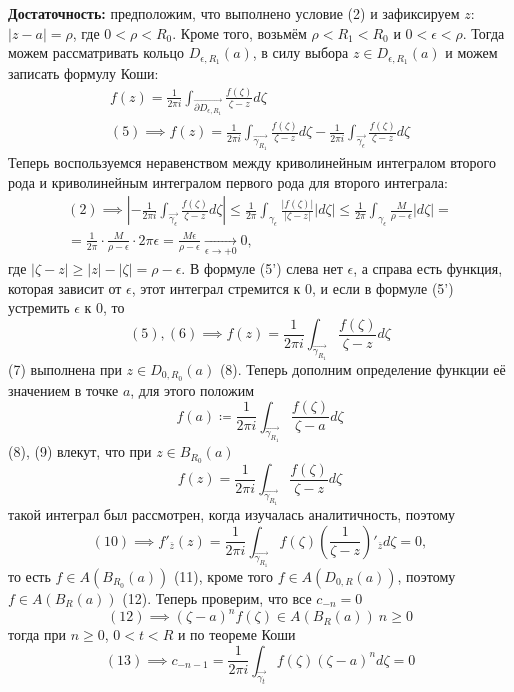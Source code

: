 \documentclass[main]{subfiles}
\begin{document}
\begin{longProof}
    \textbf{Достаточность:} предположим, что выполнено условие (2) и зафиксируем $z$: $|z - a| = \rho$, где $0 < \rho < R_0$.
    Кроме того, возьмём $\rho < R_1 < R_0$ и $0 < \epsilon < \rho$.
    Тогда можем рассматривать кольцо $D_{\epsilon, R_1}(a)$, в силу выбора $z \in D_{\epsilon, R_1}(a)$ и можем записать формулу Коши:
    \begin{gather*}
        f(z) = \frac{1}{2 \pi i} \int_{\overrightarrow{\partial D_{\epsilon, R_1}}} \frac{f(\zeta)}{\zeta - z} d\zeta \tag{5}\\
        (5) \implies f(z) = \frac{1}{2 \pi i } \int_{\overrightarrow{\gamma_{R_1}}} \frac{f(\zeta)}{\zeta - z} d\zeta - \frac{1}{2 \pi i } \int_{\overrightarrow{\gamma_{\epsilon}}} \frac{f(\zeta)}{\zeta - z} d\zeta \tag{5'}
    \end{gather*}
    Теперь воспользуемся неравенством между криволинейным интегралом второго рода и криволинейным интегралом первого рода для второго интеграла:
    \begin{multline*}
        (2) \implies \left| - \frac{1}{2 \pi i } \int_{\overrightarrow{\gamma_{\epsilon}}} \frac{f(\zeta)}{\zeta - z} d\zeta \right| \le \frac{1}{2 \pi} \int_{\gamma_{\epsilon}} \frac{|f(\zeta)|}{|\zeta - z|} |d\zeta| \le \frac{1}{2 \pi} \int_{\gamma_{\epsilon}} \frac{M}{\rho - \epsilon} |d\zeta| = \\
        = \frac{1}{2 \pi} \cdot \frac{M}{\rho - \epsilon} \cdot 2 \pi \epsilon = \frac{M\epsilon}{\rho - \epsilon} \xrightarrow[\epsilon \to +0]{} 0, \tag{6}
    \end{multline*}
    где $|\zeta - z| \ge |z| - |\zeta| = \rho - \epsilon$.
    В формуле (5') слева нет $\epsilon$, а справа есть функция, которая зависит от $\epsilon$, этот интеграл стремится к 0, и если в формуле (5') устремить $\epsilon$ к 0, то
    \[(5), (6) \implies f(z) = \frac{1}{2 \pi i} \int_{\overrightarrow{\gamma_{R_1}}} \frac{f(\zeta)}{\zeta - z} d\zeta \tag{7}\]
    (7) выполнена при $z \in D_{0, R_0} (a)$ (8).
    Теперь дополним определение функции её значением в точке $a$, для этого положим
    \[f(a) \coloneqq \frac{1}{2 \pi i} \int_{\overrightarrow{\gamma_{R_1}}} \frac{f(\zeta)}{\zeta - a} d\zeta \tag{9}\]
    (8), (9) влекут, что при $z \in B_{R_0} (a)$
    \[f(z) = \frac{1}{2 \pi i} \int_{\overrightarrow{\gamma_{R_1}}} \frac{f(\zeta)}{\zeta - z} d\zeta \tag{10}\]
    такой интеграл был рассмотрен, когда изучалась аналитичность, поэтому
    \[(10) \implies f'_{\overline{z}} (z) = \frac{1}{2 \pi i} \int_{\overrightarrow{\gamma_{R_1}}} f(\zeta) \left(\frac{1}{\zeta - z}\right)'_{\overline{z}} d\zeta = 0,\]
    то есть $f \in A(B_{R_0}(a))$ (11), кроме того $f \in A(D_{0, R}(a))$, поэтому $f \in A(B_R(a))$ (12).
    Теперь проверим, что все $c_{-n}=0$
    \[(12) \implies (\zeta - a)^n f(\zeta) \in A(B_{R}(a))\ n \ge 0 \tag{13}\]
    тогда при $n \ge 0$, $0 < t < R$ и по теореме Коши
    \[(13) \implies c_{-n-1} = \frac{1}{2 \pi i} \int_{\overrightarrow{\gamma_t}} f(\zeta)(\zeta - a)^n d\zeta = 0\]
\end{longProof}
\end{document}

